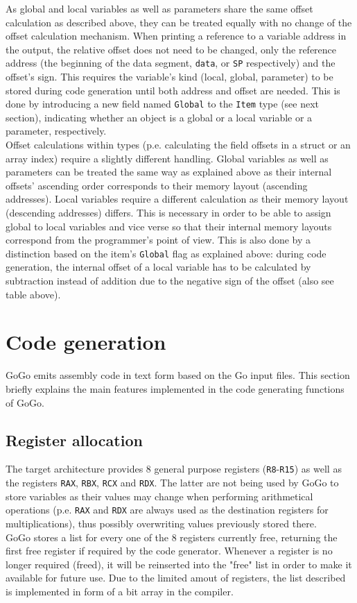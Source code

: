 \documentclass[a4paper]{scrreprt}
\begin{document}
      As global and local variables as well as parameters share the same offset calculation as described above, they can be treated equally with no change of the offset calculation mechanism. When printing a reference to a variable address in the output, the relative offset does not need to be changed, only the reference address (the beginning of the data segment, \texttt{data}, or \texttt{SP} respectively) and the offset's sign. This requires the variable's kind (local, global, parameter) to be stored during code generation until both address and offset are needed. This is done by introducing a new field named \texttt{Global} to the \texttt{Item} type (see next section), indicating whether an object is a global or a local variable or a parameter, respectively.\\
      Offset calculations within types (p.e. calculating the field offsets in a struct or an array index) require a slightly different handling. Global variables as well as parameters can be treated the same way as explained above as their internal offsets' ascending order corresponds to their memory layout (ascending addresses). Local variables require a different calculation as their memory layout (descending addresses) differs. This is necessary in order to be able to assign global to local variables and vice verse so that their internal memory layouts correspond from the programmer's point of view. This is also done by a distinction based on the item's \texttt{Global} flag as explained above: during code generation, the internal offset of a local variable has to be calculated by subtraction instead of addition due to the negative sign of the offset (also see table above).

  \chapter{Code generation}
    GoGo emits assembly code in text form based on the Go input files. This section briefly explains the main features implemented in the code generating functions of GoGo.

    \section{Register allocation}
        The target architecture provides 8 general purpose registers (\texttt{R8}-\texttt{R15}) as well as the registers \texttt{RAX}, \texttt{RBX}, \texttt{RCX} and \texttt{RDX}\cite{int09}. The latter are not being used by GoGo to store variables as their values may change when performing arithmetical operations (p.e. \texttt{RAX} and \texttt{RDX} are always used as the destination registers for multiplications), thus possibly overwriting values previously stored there.\\
        GoGo stores a list for every one of the 8 registers currently free, returning the first free register if required by the code generator. Whenever a register is no longer required (freed), it will be reinserted into the "free" list in order to make it available for future use. Due to the limited amout of registers, the list described is implemented in form of a bit array in the compiler.
\end{document}
